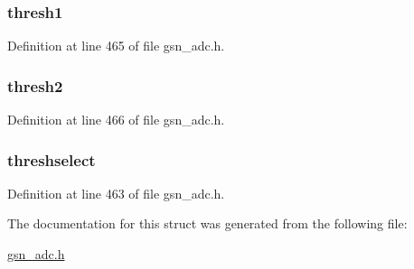 \hypertarget{a00023_a93585db848a7e64a531a78ccf0902baa}{
\subsubsection[{thresh1}]{ {\bf thresh1}}}
\label{a00023_a93585db848a7e64a531a78ccf0902baa}


Definition at line 465 of file gsn\_\-adc.h.

\hypertarget{a00023_a1aea5536e1a51f77062869186dda5dc7}{
\subsubsection[{thresh2}]{ {\bf thresh2}}}
\label{a00023_a1aea5536e1a51f77062869186dda5dc7}


Definition at line 466 of file gsn\_\-adc.h.

\hypertarget{a00023_ae653bd57e4610763a968fdc6e2b6c1e1}{
\subsubsection[{threshselect}]{ {\bf threshselect}}}
\label{a00023_ae653bd57e4610763a968fdc6e2b6c1e1}


Definition at line 463 of file gsn\_\-adc.h.



The documentation for this struct was generated from the following file:\begin{DoxyCompactItemize}
\item 
\hyperlink{a00474}{gsn\_\-adc.h}\end{DoxyCompactItemize}

